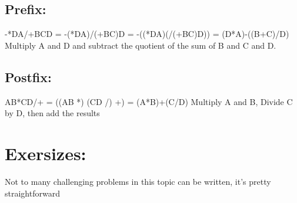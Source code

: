 \documentclass{article}
\begin{document}
\subsection{Prefix:}
-*DA/+BCD = -(*DA)/(+BC)D = -((*DA)(/(+BC)D)) = (D*A)-((B+C)/D) Multiply A and D and subtract the quotient of the sum of B and C and D.

\subsection{Postfix:}
AB*CD/+ = ((AB *) (CD /) +) = (A*B)+(C/D)
Multiply A and B, Divide C by D, then add the results

\section{Exersizes:}
Not to many challenging problems in this topic can be written, it's pretty straightforward
\end{document}
